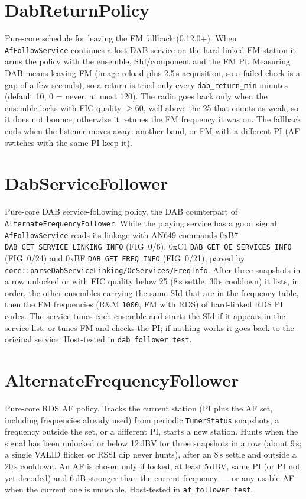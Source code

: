 \section{DabReturnPolicy}\label{cls:DabReturnPolicy}
Pure-core schedule for leaving the FM fallback (0.12.0+). When
\texttt{AfFollowService} continues a lost DAB service on the hard-linked
FM station it arms the policy with the ensemble, SId/component and the
FM PI. Measuring DAB means leaving FM (image reload plus 2.5\,s
acquisition, so a failed check is a gap of a few seconds), so a return is
tried only every \texttt{dab\_return\_min} minutes (default 10, 0 = never,
at most 120). The radio goes back only when the ensemble locks with FIC
quality $\geq$60, well above the 25 that counts as weak, so it does not
bounce; otherwise it retunes the FM frequency it was on. The fallback ends
when the listener moves away: another band, or FM with a different PI
(AF switches with the same PI keep it).

\section{DabServiceFollower}\label{cls:DabServiceFollower}
Pure-core DAB service-following policy, the DAB counterpart of
\texttt{AlternateFrequencyFollower}. While the playing service has a good
signal, \texttt{AfFollowService} reads its linkage with AN649 commands
0xB7 \texttt{DAB\_GET\_SERVICE\_LINKING\_INFO} (FIG~0/6), 0xC1
\texttt{DAB\_GET\_OE\_SERVICES\_INFO} (FIG~0/24) and 0xBF
\texttt{DAB\_GET\_FREQ\_INFO} (FIG~0/21), parsed by
\texttt{core::parseDabServiceLinking/OeServices/FreqInfo}. After three
snapshots in a row unlocked or with FIC quality below 25 (8\,s settle,
30\,s cooldown) it lists, in order, the other ensembles carrying the same
SId that are in the frequency table, then the FM frequencies (R\&M
\texttt{1000}, FM with RDS) of hard-linked RDS PI codes. The service tunes
each ensemble and starts the SId if it appears in the service list, or
tunes FM and checks the PI; if nothing works it goes back to the original
service. Host-tested in \texttt{dab\_follower\_test}.

\section{AlternateFrequencyFollower}\label{cls:AlternateFrequencyFollower}
Pure-core RDS AF policy. Tracks the current station (PI plus the AF set,
including frequencies already used) from periodic \texttt{TunerStatus}
snapshots; a frequency outside the set, or a different PI, starts a new
station. Hunts when the signal has been unlocked or below 12\,dB\textmu V for
three snapshots in a row (about 9\,s; a single VALID flicker or RSSI dip
never hunts), after an 8\,s settle and outside a 20\,s cooldown. An AF is chosen only if locked,
at least 5\,dB\textmu V, same PI (or PI not yet decoded) and 6\,dB stronger
than the current frequency --- or any usable AF when the current one is
unusable. Host-tested in \texttt{af\_follower\_test}.

